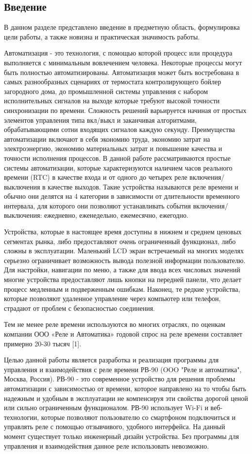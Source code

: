 \subsection{Введение}

В данном разделе представлено введение в предметную область, формулировка цели работы, а также новизна и практическая значимость работы.

Автоматизация - это технология, с помощью которой процесс или процедура выполняется с минимальным вовлечением человека. Некоторые процессы могут быть полностью автоматизированы. Автоматизация может быть востребована в самых разнообразных сценариях от термостата контролирующего бойлер загородного дома, до промышленной системы управления с набором исполнительных сигналов на выходе которые требуют высокой точности синхронизации по времени. Сложность решений варьируется начиная от простых элементов управления типа вкл/выкл и заканчивая алгоритмами, обрабатывающими сотни входящих сигналов каждую секунду. Преимущества автоматизации включают в себя экономию труда, экономию затрат на электроэнергию, экономию материальных затрат и повышение качества и точности исполнения процессов. В данной работе  рассматриваются простые системы автоматизации, которые характеризуются наличием часов реального времени (RTC) в качестве входа и от одного до четырех реле включения/выключения в качестве выходов. Такие устройства называются реле времени и обычно они делятся на 4 категории в зависимости от длительности временного интервала, для которого они позволяют устанавливать события включения/выключения: ежедневно, еженедельно, ежемесячно, ежегодно.

Устройства, которые в настоящее время доступны в нижнем и среднем ценовых  сегментах рынка, либо предоставляют очень ограниченный функционал, либо сложны в эксплуатации. Маленький LCD экран встречаемый на многих моделях серьезно ограничивает возможность вывода полезной информации пользователю. Для настройки, навигации по меню, а также для ввода всех числовых значений многие устройства предоставляют лишь кнопки на передней панели, что делает процесс медленным и подверженным ошибкам. Наконец, те редкие устройства, которые позволяют удаленное управление через компьютер или телефон, страдают от проблем с безопасностью соединения.

Тем не менее реле времени используются во многих отраслях, по оценкам компании ООО «Реле и Автоматика» годовой спрос на реле времени составляет примерно 20-30 тысяч [1].

Целью данной работы является разработка и реализация программы для управления и взаимодействия с реле времени РВ-90 (OOO "Реле и автоматика", Москва, Россия). РВ-90 - это современное устройство для решения проблемы автоматизации с зависимостью от времени, которое направлено на то чтобы быть надежным и удобным в эксплуатации не компенсируя эти свойства дорогой ценой или сильно ограниченным функционалом. РВ-90 использует Wi-Fi и веб-технологии, которые позволяют пользователю со смартфоном подключиться и управлять реле с помощью отзывчивого, удобного интерфейса. На данный момент существует только инженерный дизайн устройства. Без программы для управления и взаимодействия данное реле использовать невозможно.

